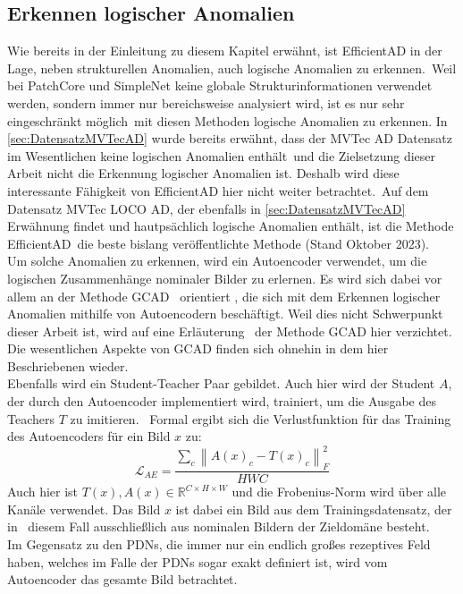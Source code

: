 \subsection{Erkennen logischer Anomalien}\label{subsec:erkennenlogischeranomalien}
Wie bereits in der Einleitung zu diesem Kapitel erwähnt, ist EfficientAD in der Lage, neben strukturellen Anomalien, auch logische Anomalien zu erkennen.\
Weil bei PatchCore und SimpleNet keine globale Strukturinformationen verwendet werden, sondern immer nur bereichsweise analysiert wird, ist es nur sehr eingeschränkt möglich\
mit diesen Methoden logische Anomalien zu erkennen. In \ref{sec:DatensatzMVTecAD} wurde bereits erwähnt, dass der MVTec AD Datensatz im Wesentlichen keine logischen Anomalien enthält\
und die Zielsetzung dieser Arbeit nicht die Erkennung logischer Anomalien ist. Deshalb wird diese interessante Fähigkeit von EfficientAD hier nicht weiter betrachtet.\
Auf dem Datensatz MVTec LOCO AD, der ebenfalls in \ref{sec:DatensatzMVTecAD} Erwähnung findet und hautpsächlich logische Anomalien enthält, ist die Methode EfficientAD\
die beste bislang veröffentlichte Methode (Stand Oktober 2023). \cite{mvtecadloco} \\
Um solche Anomalien zu erkennen, wird ein Autoencoder verwendet, um die logischen Zusammenhänge nominaler Bilder zu erlernen. Es wird sich dabei vor allem an der Methode \glqq GCAD\grqq{} \
orientiert \cite{gcad}, die sich mit dem Erkennen logischer Anomalien mithilfe von Autoencodern beschäftigt. Weil dies nicht Schwerpunkt dieser Arbeit ist, wird auf eine Erläuterung \
der Methode GCAD hier verzichtet. Die wesentlichen Aspekte von GCAD finden sich ohnehin in dem hier Beschriebenen wieder.\\
Ebenfalls wird ein Student-Teacher Paar gebildet. Auch hier wird der Student $A$, der durch den Autoencoder implementiert wird, trainiert, um die Ausgabe des Teachers $T$ zu imitieren. \
Formal ergibt sich die Verlustfunktion für das Training des Autoencoders für ein Bild $x$ zu: \
$$
\mathcal{L}_{AE} = \frac{\sum_{c}\left\lVert A(x)_{c}-T(x)_{c} \right\rVert_{F}^{2}}{HWC}
$$
Auch hier ist $T(x), A(x) \in \mathbb{R}^{C \times H \times W}$ und die Frobenius-Norm wird über alle Kanäle verwendet. Das Bild $x$ ist dabei ein Bild aus dem Trainingsdatensatz, der in \
diesem Fall ausschließlich aus nominalen Bildern der Zieldomäne besteht.\\
Im Gegensatz zu den PDNs, die immer nur ein endlich großes rezeptives Feld haben, welches im Falle der PDNs sogar exakt definiert ist, wird vom Autoencoder das gesamte Bild betrachtet.\
